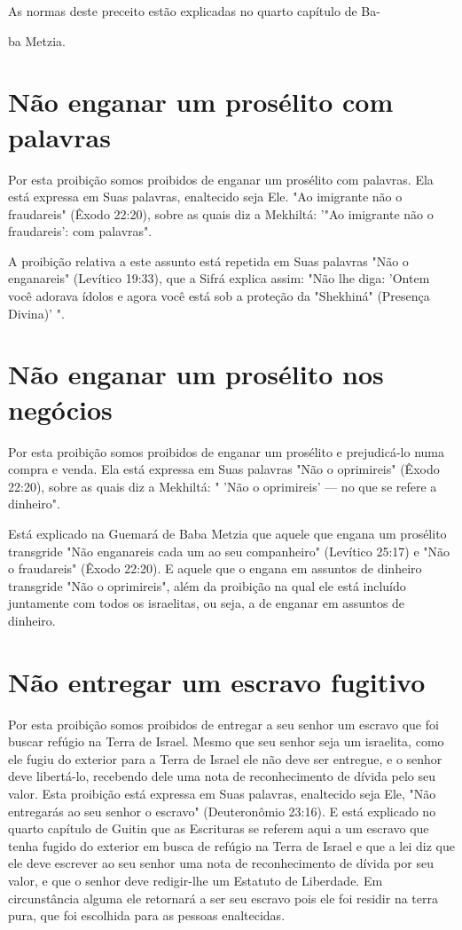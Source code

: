\begin{itemize}
\begin{enumrate}
\begin{itemize}
\begin{itemize}
\begin{itemize}
As normas deste preceito estão explicadas no quarto capítulo de Ba-


ba Metzia.

\section{Não enganar um prosélito com palavras}

Por esta proibição somos proibidos de enganar um prosélito com palavras.
Ela está expressa em Suas palavras, enaltecido seja Ele. "Ao imigrante
não o fraudareis" (Êxodo 22:20), sobre as quais diz a Mekhiltá: '"Ao
imigrante não o fraudareis': com palavras".

A proibição relativa a este assunto está repetida em Suas palavras "Não
o enganareis" (Levítico 19:33), que a Sifrá explica assim: "Não lhe
diga: 'On­tem você adorava ídolos e agora você está sob a proteção da
"Shekhiná" (Pre­sença Divina)' ".

\section{Não enganar um prosélito nos negócios}

Por esta proibição somos proibidos de enganar um prosélito e
prejudicá-lo numa compra e venda. Ela está expressa em Suas palavras
"Não o oprimireis" (Êxodo 22:20), sobre as quais diz a Mekhiltá: 
" 'Não o
oprimireis' --- no que se refere a dinheiro".

Está explicado na Guemará de Baba Metzia que aquele que engana um
prosélito transgride "Não enganareis cada um ao seu companheiro"
(Leví­tico 25:17) e "Não o fraudareis" (Êxodo 22:20). E aquele que o
engana em as­suntos de dinheiro transgride "Não o oprimireis", além da
proibição na qual ele está incluído juntamente com todos os israelitas,
ou seja, a de enganar em assuntos de dinheiro.

\section{Não entregar um escravo fugitivo}

Por esta proibição somos proibidos de entregar a seu senhor um es­cravo
que foi buscar refúgio na Terra de Israel. Mesmo que seu senhor seja um
israelita, como ele fugiu do exterior para a Terra de Israel ele não
deve ser en­tregue, e o senhor deve libertá-lo, recebendo dele uma nota
de reconhecimen­to de dívida pelo seu valor. Esta proibição está
expressa em Suas palavras, enal­tecido seja Ele, "Não entregarás ao seu
senhor o escravo" (Deuteronômio 23:16). E está explicado no quarto
capítulo de Guitin que as Escrituras se referem aqui a um escravo que
tenha fugido do exterior em busca de refúgio na Terra de Israel e que a
lei diz que ele deve escrever ao seu senhor uma nota de reconhe­cimento
de dívida por seu valor, e que o senhor deve redigir-lhe um Estatuto de
Liberdade. Em circunstância alguma ele retornará a ser seu escravo pois
ele foi residir na terra pura, que foi escolhida para as pessoas
enaltecidas.


\end{itemize}
\end{itemize}
\end{itemize}
\end{enumrate}
\end{itemize}
